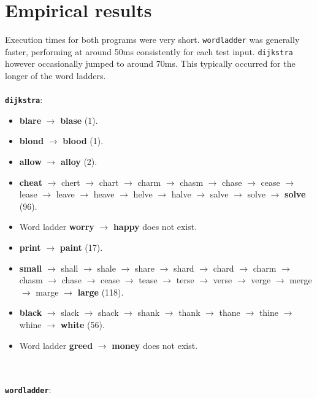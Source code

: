 \documentclass{article}
\begin{document}
\section*{Empirical results}

Execution times for both programs were very short. \texttt{wordladder} was generally faster, performing at around 50ms consistently for each test input. \texttt{dijkstra} however occasionally jumped to around 70ms. This typically occurred for the longer of the word ladders.
\\\\
\texttt{\textbf{dijkstra}}:

\begin{itemize}
    \item \textbf{blare} $\rightarrow$ \textbf{blase} (1).
    \item \textbf{blond} $\rightarrow$ \textbf{blood} (1).
    \item \textbf{allow} $\rightarrow$ \textbf{alloy} (2).
    \item \textbf{cheat} $\rightarrow$ chert $\rightarrow$ chart $\rightarrow$ charm $\rightarrow$ chasm $\rightarrow$ chase $\rightarrow$ cease $\rightarrow$ lease $\rightarrow$ leave $\rightarrow$ heave $\rightarrow$ helve $\rightarrow$ halve $\rightarrow$ salve $\rightarrow$ solve $\rightarrow$ \textbf{solve} (96).
    \item Word ladder \textbf{worry} $\rightarrow$ \textbf{happy} does not exist.
    \item \textbf{print} $\rightarrow$ \textbf{paint} (17).
    \item \textbf{small} $\rightarrow$ shall $\rightarrow$ shale $\rightarrow$ share $\rightarrow$ shard $\rightarrow$ chard $\rightarrow$ charm $\rightarrow$ chasm $\rightarrow$ chase $\rightarrow$ cease $\rightarrow$ tease $\rightarrow$ terse $\rightarrow$ verse $\rightarrow$ verge $\rightarrow$ merge $\rightarrow$ marge $\rightarrow$ \textbf{large} (118).
    \item \textbf{black} $\rightarrow$ slack $\rightarrow$ shack $\rightarrow$ shank $\rightarrow$ thank $\rightarrow$ thane $\rightarrow$ thine $\rightarrow$ whine $\rightarrow$ \textbf{white} (56).
    \item Word ladder \textbf{greed} $\rightarrow$ \textbf{money} does not exist.
\end{itemize}
\\\\
\texttt{\textbf{wordladder}}:
\end{document}

